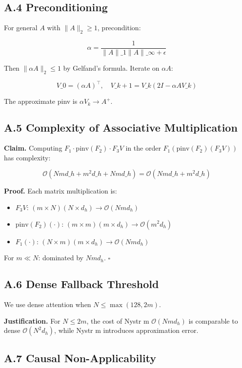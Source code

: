 \subsection{A.4 Preconditioning}

For general $A$ with $\|A\|_2 \geq 1$, precondition:

\[
\alpha = \frac{1}{\|A\|\_1 \|A\|\_\infty + \epsilon}
\tag{A.5}
\]

Then $\|\alpha A\|_2 \leq 1$ by Gelfand's formula. Iterate on $\alpha A$:

\[
V\_0 = (\alpha A)^\top, \quad V\_{k+1} = V\_k (2I - \alpha A V\_k)
\tag{A.6}
\]

The approximate pinv is $\alpha V_k \to A^+$.

\subsection{A.5 Complexity of Associative Multiplication}

\textbf{Claim.} Computing $F_1 \cdot \text{pinv}(F_2) \cdot F_3 V$ in the order 
$F_1 (\text{pinv}(F_2) (F_3 V))$ has complexity:

\[
\mathcal{O}(N m d\_h + m^2 d\_h + N m d\_h) = \mathcal{O}(N m d\_h + m^2 d\_h)
\tag{A.7}
\]

\textbf{Proof.} Each matrix multiplication is:
\begin{itemize}
\item $F_3 V$: $(m \times N) (N \times d_h) \to \mathcal{O}(N m d_h)$
\item $\text{pinv}(F_2) (\cdot)$: $(m \times m) (m \times d_h) \to \mathcal{O}(m^2 d_h)$
\item $F_1 (\cdot)$: $(N \times m) (m \times d_h) \to \mathcal{O}(N m d_h)$

\end{itemize}
For $m \ll N$: dominated by $N m d_h$. $\square$

\subsection{A.6 Dense Fallback Threshold}

We use dense attention when $N \leq \max(128, 2m)$.

\textbf{Justification.} For $N \leq 2m$, the cost of Nystr m $\mathcal{O}(N m d_h)$ 
is comparable to dense $\mathcal{O}(N^2 d_h)$, while Nystr m introduces 
approximation error.

\subsection{A.7 Causal Non-Applicability}

